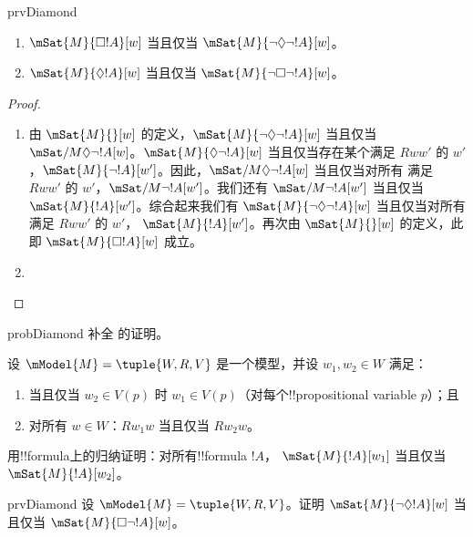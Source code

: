 \documentclass[../../../include/open-logic-section]{subfiles}
\begin{document}
\begin{tagblock}{prvDiamond}
\begin{prop}
  \begin{enumerate}
  \item $\mSat{M}{\Box !A}[w]$ 当且仅当 $\mSat{M}{\lnot\Diamond\lnot !A}[w]$。
  \item $\mSat{M}{\Diamond !A}[w]$ 当且仅当 $\mSat{M}{\lnot\Box\lnot !A}[w]$。
  \end{enumerate}
\end{prop}

\begin{proof}
  \begin{enumerate}
    \item 由 $\mSat{M}{}[w]$ 的定义，$\mSat{M}{\lnot\Diamond\lnot !A}[w]$ 当且仅当
      $\mSat/{M}{\Diamond\lnot !A}[w]$。$\mSat{M}{\Diamond\lnot
      !A}[w]$ 当且仅当存在某个满足 $Rww'$ 的 $w'$，$\mSat{M}{\lnot
      !A}[w']$。因此，$\mSat/{M}{\Diamond\lnot !A}[w]$ 当且仅当对所有
    满足 $Rww'$ 的 $w'$，$\mSat/{M}{\lnot !A}[w']$。我们还有
    $\mSat/{M}{\lnot !A}[w']$ 当且仅当 $\mSat{M}{!A}[w']$。综合起来我们有
    $\mSat{M}{\lnot\Diamond\lnot !A}[w]$ 当且仅当对所有满足 $Rww'$ 的 $w'$，
    $\mSat{M}{!A}[w']$。再次由 $\mSat{M}{}[w]$ 的定义，此即
      $\mSat{M}{\Box !A}[w]$ 成立。
    \item {}
  \end{enumerate}
\end{proof}

\begin{probtag}{probDiamond}
  补全  的证明。
\end{probtag}
\end{tagblock}

\begin{prob}
  设 $\mModel{M} = \tuple{W, R, V}$ 是一个模型，并设 $w_1, w_2 \in
  W$ 满足：
  \begin{enumerate}
  \item 当且仅当 $w_2 \in V(p)$ 时 $w_1 \in V(p)$（对每个!!{propositional variable} $p$）；且
  \item 对所有 $w \in W$：$Rw_1w$ 当且仅当 $Rw_2w$。
  \end{enumerate}
  用!!{formula}上的归纳证明：对所有!!{formula} $!A$，
  $\mSat{M}{!A}[w_1]$ 当且仅当 $\mSat{M}{!A}[w_2]$。
\end{prob}

\begin{probtag}{prvDiamond}
  设 $\mModel{M} = \tuple{W, R, V}$。证明
  $\mSat{M}{\lnot\Diamond !A}[w]$ 当且仅当
  $\mSat{M}{\Box\lnot!A}[w]$。
\end{probtag}
\end{document}
